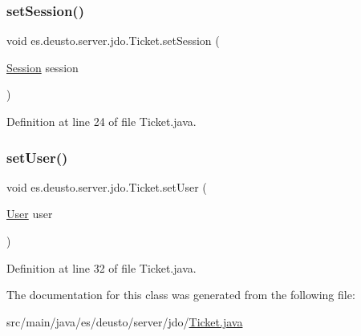 \subsubsection{\texorpdfstring{setSession()}{setSession()}}
{\footnotesize\ttfamily void es.\+deusto.\+server.\+jdo.\+Ticket.\+set\+Session (\begin{DoxyParamCaption}\item[{\mbox{\hyperlink{classes_1_1deusto_1_1server_1_1jdo_1_1_session}{Session}}}]{session }\end{DoxyParamCaption})}



Definition at line 24 of file Ticket.\+java.

\mbox{\label{classes_1_1deusto_1_1server_1_1jdo_1_1_ticket_a072a5e49ddc7060bd6cb521e90d15908}} 
\subsubsection{\texorpdfstring{setUser()}{setUser()}}
{\footnotesize\ttfamily void es.\+deusto.\+server.\+jdo.\+Ticket.\+set\+User (\begin{DoxyParamCaption}\item[{\mbox{\hyperlink{classes_1_1deusto_1_1server_1_1jdo_1_1_user}{User}}}]{user }\end{DoxyParamCaption})}



Definition at line 32 of file Ticket.\+java.



The documentation for this class was generated from the following file\+:\begin{DoxyCompactItemize}
\item 
src/main/java/es/deusto/server/jdo/\mbox{\hyperlink{_ticket_8java}{Ticket.\+java}}\end{DoxyCompactItemize}
